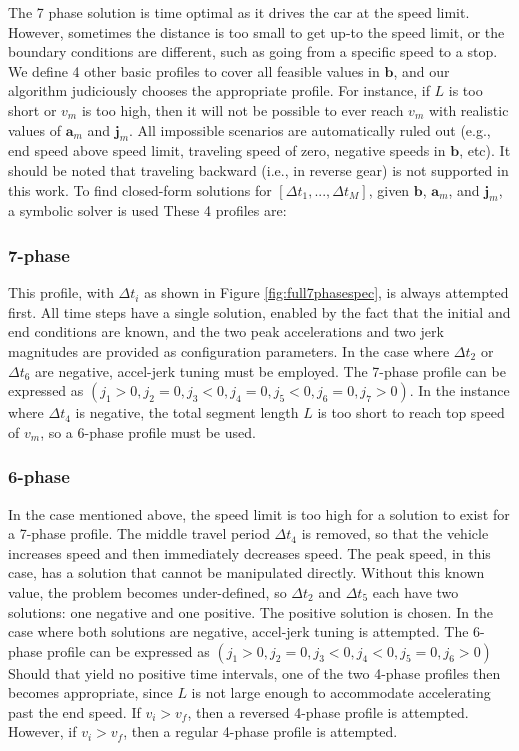 \documentclass[letterpaper, 10 pt, conference]{ieeeconf}  %
\begin{document}
The 7 phase solution is time optimal as it drives the car at the speed limit. However, sometimes the distance is too small to get up-to the speed limit, or the boundary conditions are different, such as going from a specific speed to a stop. We define 4 other basic profiles to cover all feasible values in $\mathbf{b}$, and our algorithm judiciously chooses the appropriate profile. %
For instance, if $L$ is too short or $v_m$ is too high, then it will not be possible to ever reach $v_m$ with realistic values of $\mathbf{a}_m$ and $\mathbf{j}_m$.
All impossible scenarios are automatically ruled out (e.g., end speed above speed limit, traveling speed of zero, negative speeds in $\mathbf{b}$, etc).
It should be noted that traveling backward (i.e., in reverse gear) is not supported in this work.
To find closed-form solutions for $[\Delta t_1, ..., \Delta t_M]$, given $\mathbf{b}$, $\mathbf{a}_m$, and $\mathbf{j}_m$, a symbolic solver is used 
These 4 profiles are:

\subsubsection{7-phase} \label{sec:7phase}

This profile, with $\Delta t_i$ as shown in Figure \ref{fig:full7phasespec}, is always attempted first.
All time steps have a single solution, enabled by the fact that the initial and end conditions are known, and the two peak accelerations and two jerk magnitudes are provided as configuration parameters.
In the case where $\Delta t_2$ or $\Delta t_6$ are negative, accel-jerk tuning must be employed.
The 7-phase profile can be expressed as $( j_1 > 0 , j_2 = 0 , j_3 < 0 , j_4 = 0 , j_5 < 0 , j_6 = 0 , j_7 > 0 )$.
In the instance where $\Delta t_4$ is negative, the total segment length $L$ is too short to reach top speed of $v_m$, so a 6-phase profile must be used.

\subsubsection{6-phase} \label{sec:6phase}

In the case mentioned above, the speed limit is too high for a solution to exist for a 7-phase profile.
The middle travel period $\Delta t_4$ is removed, so that the vehicle increases speed and then immediately decreases speed. 
The peak speed, in this case, has a solution that cannot be manipulated directly.
Without this known value, the problem becomes under-defined, so $\Delta t_2$ and $\Delta t_5$ each have two solutions: one negative and one positive.
The positive solution is chosen.
In the case where both solutions are negative, accel-jerk tuning is attempted. 
The 6-phase profile can be expressed as $( j_1 > 0 , j_2 = 0 , j_3 < 0 , j_4 < 0 , j_5 = 0 , j_6 > 0 )$
Should that yield no positive time intervals, one of the two 4-phase profiles then becomes appropriate, since $L$ is not large enough to accommodate accelerating past the end speed.
If $v_i > v_f$, then a reversed 4-phase profile is attempted.
However, if $v_i > v_f$, then a regular 4-phase profile is attempted.
\end{document}
